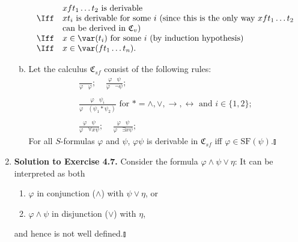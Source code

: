 \begin{enumerate}[1.]
\begin{enumerate}[(a)]
\[
\begin{array}{ll}
\, & xft_1 \ldots t_2 \mbox{ is derivable} \\
\Iff & xt_i \mbox{ is derivable for some } i \mbox{    (since this is the only way $xft_1 \ldots t_2$} \\
\, & \mbox{can be derived in $\mathfrak{C}_v$)} \\
\Iff & x \in \var(t_i) \mbox{ for some } i \mbox{    (by induction hypothesis)} \\
\Iff & x \in \var(ft_1 \ldots t_n).
\end{array}
\]
\item Let the calculus $\mathfrak{C}_{sf}$ consist of the following rules:
\[
\begin{array}{l}
\displaystyle \frac{ \, }{\varphi \;\;\; \varphi}; \;\;\;\; \frac{\varphi \;\;\; \psi}{\varphi \;\;\; \neg \psi}; \\
\, \\
\displaystyle \frac{\varphi \;\;\; \psi_i}{\varphi \;\;\; (\psi_1 \ast \psi_2)} \mbox{ for } \ast = \land, \lor, \rightarrow, \leftrightarrow \mbox{ and } i \in \{1, 2\}; \\
\, \\
\displaystyle \frac{\varphi \;\;\; \psi}{\varphi \;\;\; \forall x \psi}; \;\;\;\; \displaystyle \frac{\varphi \;\;\; \psi}{\varphi \;\;\; \exists x \psi};
\end{array}
\]
For all $S$-formulas $\varphi$ and $\psi$, $\varphi\psi$ is derivable in $\mathfrak{C}_{sf}$ iff $\varphi \in \mathrm{SF}(\psi)$.\nolinebreak\hfill$\talloblong$
\end{enumerate}
%
\item \textbf{Solution to Exercise 4.7.} Consider the formula $\varphi \land \psi \lor \eta$: It can be interpreted as both
\begin{enumerate}[(1)]
\item $\varphi$ in conjunction ($\land$) with $\psi \lor \eta$, or
\item $\varphi \land \psi$ in disjunction ($\lor$) with $\eta$,
\end{enumerate}
and hence is not well defined.\nolinebreak\hfill$\talloblong$
%

\end{enumerate}
